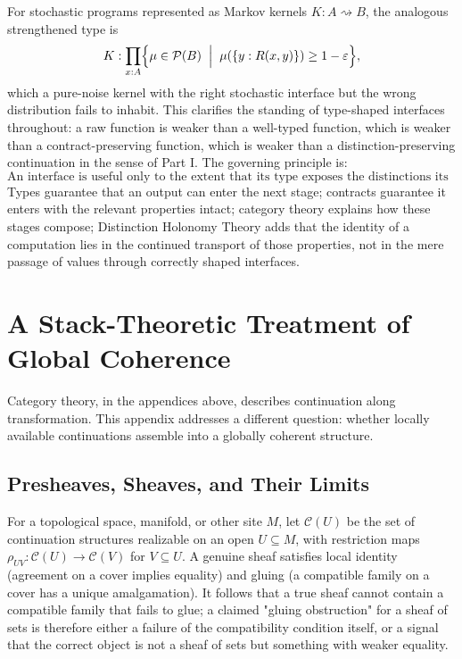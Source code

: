 \documentclass[11pt]{article}
\begin{document}
For stochastic programs represented as Markov kernels $K : A \rightsquigarrow B$, the analogous strengthened type is
\[
K : \prod_{x:A} \Bigl\{ \mu \in \mathcal{P}(B) \;\Bigm|\; \mu(\{y : R(x,y)\}) \geq 1-\varepsilon \Bigr\},
\]
which a pure-noise kernel with the right stochastic interface but the wrong distribution fails to inhabit. This clarifies the standing of type-shaped interfaces throughout: a raw function is weaker than a well-typed function, which is weaker than a contract-preserving function, which is weaker than a distinction-preserving continuation in the sense of Part I. The governing principle is:
\[
\text{An interface is useful only to the extent that its type exposes the distinctions its consumers require.}
\]
Types guarantee that an output can enter the next stage; contracts guarantee it enters with the relevant properties intact; category theory explains how these stages compose; Distinction Holonomy Theory adds that the identity of a computation lies in the continued transport of those properties, not in the mere passage of values through correctly shaped interfaces.

\section{A Stack-Theoretic Treatment of Global Coherence}
\label{app:stack}

Category theory, in the appendices above, describes continuation along transformation. This appendix addresses a different question: whether locally available continuations assemble into a globally coherent structure.

\subsection{Presheaves, Sheaves, and Their Limits}

For a topological space, manifold, or other site $M$, let $\mathscr{C}(U)$ be the set of continuation structures realizable on an open $U \subseteq M$, with restriction maps $\rho_{UV} : \mathscr{C}(U) \to \mathscr{C}(V)$ for $V \subseteq U$. A genuine sheaf satisfies local identity (agreement on a cover implies equality) and gluing (a compatible family on a cover has a unique amalgamation). It follows that a true sheaf cannot contain a compatible family that fails to glue; a claimed "gluing obstruction" for a sheaf of sets is therefore either a failure of the compatibility condition itself, or a signal that the correct object is not a sheaf of sets but something with weaker equality.
\end{document}
